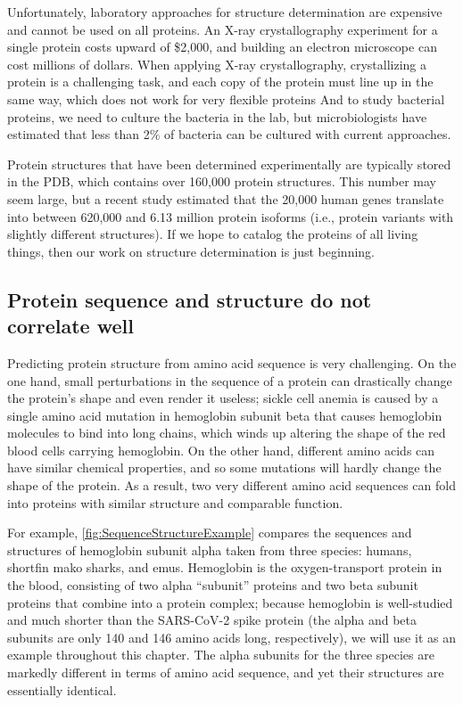 Unfortunately, laboratory approaches for structure determination are expensive and cannot be used on all proteins. An X-ray crystallography experiment for a single protein costs upward of \$2,000, and building an electron microscope can cost millions of dollars. When applying X-ray crystallography, crystallizing a protein is a challenging task, and each copy of the protein must line up in the same way, which does not work for very flexible proteins  And to study bacterial proteins, we need to culture the bacteria in the lab, but microbiologists have estimated that less than 2\% of bacteria can be cultured with current approaches.

Protein structures that have been determined experimentally are typically stored in the PDB, which contains over 160,000 protein structures. This number may seem large, but a recent study estimated that the 20,000 human genes translate into between 620,000 and 6.13 million protein isoforms (i.e., protein variants with slightly different structures). If we hope to catalog the proteins of all living things, then our work on structure determination is just beginning.

\FloatBarrier
{}
\subsection{Protein sequence and structure do not correlate well}

Predicting protein structure from amino acid sequence is very challenging. On the one hand, small perturbations in the sequence of a protein can drastically change the protein's shape and even render it useless; sickle cell anemia is caused by a single amino acid mutation in hemoglobin subunit beta that causes hemoglobin molecules to bind into long chains, which winds up altering the shape of the red blood cells carrying hemoglobin. On the other hand, different amino acids can have similar chemical properties, and so some mutations will hardly change the shape of the protein. As a result, two very different amino acid sequences can fold into proteins with similar structure and comparable function.

For example, \autoref{fig:SequenceStructureExample} compares the sequences and structures of hemoglobin subunit alpha taken from three species: humans, shortfin mako sharks, and emus. Hemoglobin is the oxygen-transport protein in the blood, consisting of two alpha ``subunit'' proteins and two beta subunit proteins that combine into a protein complex; because hemoglobin is well-studied and much shorter than the SARS-CoV-2 spike protein (the alpha and beta subunits are only 140 and 146 amino acids long, respectively), we will use it as an example throughout this chapter. The alpha subunits for the three species are markedly different in terms of amino acid sequence, and yet their structures are essentially identical.\\

